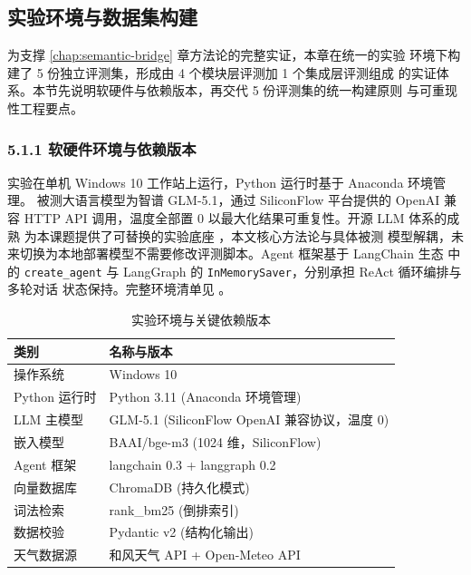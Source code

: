 ﻿%

\subsection{实验环境与数据集构建}
\label{sec:exp-env}

为支撑 \ref{chap:semantic-bridge} 章方法论的完整实证，本章在统一的实验
环境下构建了 5 份独立评测集，形成由 4 个模块层评测加 1 个集成层评测组成
的实证体系。本节先说明软硬件与依赖版本，再交代 5 份评测集的统一构建原则
与可重现性工程要点。

\subsubsection*{5.1.1 \quad 软硬件环境与依赖版本}

实验在单机 Windows 10 工作站上运行，Python 运行时基于 Anaconda 环境管理。
被测大语言模型为智谱 GLM-5.1，通过 SiliconFlow 平台提供的 OpenAI 兼容
HTTP API 调用，温度全部置 0 以最大化结果可重复性。开源 LLM 体系的成熟
为本课题提供了可替换的实验底座 \cite{ref14}，本文核心方法论与具体被测
模型解耦，未来切换为本地部署模型不需要修改评测脚本。Agent 框架基于
LangChain 生态 \cite{ref15} 中的 \texttt{create\_agent} 与
LangGraph 的 \texttt{InMemorySaver}，分别承担 ReAct 循环编排与多轮对话
状态保持。完整环境清单见 。

\begin{table}[H]
    \centering
    \caption{实验环境与关键依赖版本}
    \label{tab:exp-env}
    \song\fontsize{9pt}{12pt}\selectfont
    \renewcommand{\arraystretch}{0.95}
    \begin{tabular}{ll}
        \toprule
        类别 & 名称与版本 \\
        \midrule
        操作系统 & Windows 10 \\
        Python 运行时 & Python 3.11 (Anaconda 环境管理) \\
        LLM 主模型 & GLM-5.1 (SiliconFlow OpenAI 兼容协议，温度 0) \\
        嵌入模型 & BAAI/bge-m3 (1024 维，SiliconFlow) \\
        Agent 框架 & langchain 0.3 + langgraph 0.2 \\
        向量数据库 & ChromaDB (持久化模式) \\
        词法检索 & rank\_bm25 (倒排索引) \\
        数据校验 & Pydantic v2 (结构化输出) \\
        天气数据源 & 和风天气 API + Open-Meteo API \\
        \bottomrule
    \end{tabular}
\end{table}

